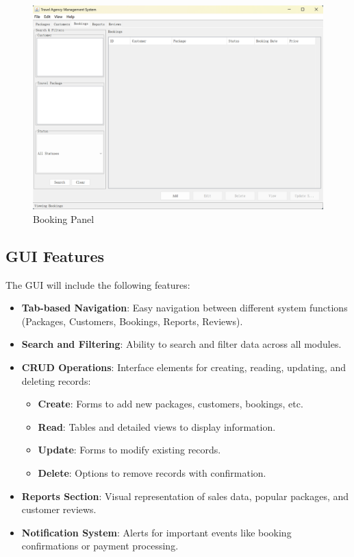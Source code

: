 \documentclass[12pt]{article}
\begin{document}
\begin{figure}[H]
\centering
\includegraphics[width=\textwidth]{gui2.png}
\caption{Booking Panel}
\end{figure}
\newpage

\subsection{GUI Features}

The GUI will include the following features:

\begin{itemize}
    \item \textbf{Tab-based Navigation}: Easy navigation between different system functions (Packages, Customers, Bookings, Reports, Reviews).
    
    \item \textbf{Search and Filtering}: Ability to search and filter data across all modules.
    
    \item \textbf{CRUD Operations}: Interface elements for creating, reading, updating, and deleting records:
    \begin{itemize}
        \item \textbf{Create}: Forms to add new packages, customers, bookings, etc.
        \item \textbf{Read}: Tables and detailed views to display information.
        \item \textbf{Update}: Forms to modify existing records.
        \item \textbf{Delete}: Options to remove records with confirmation.
    \end{itemize}
    
    \item \textbf{Reports Section}: Visual representation of sales data, popular packages, and customer reviews.
    
    \item \textbf{Notification System}: Alerts for important events like booking confirmations or payment processing.
\end{itemize}
\end{document}

